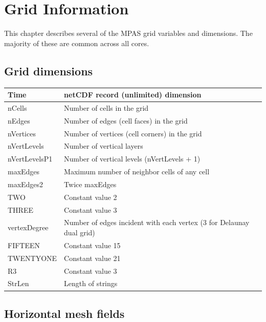 \chapter{Grid Information}

This chapter describes several of the MPAS grid variables and dimensions. The majority of these are common across all cores.

\section{Grid dimensions}

{\small
\begin{longtable}{|p{1.75in} |p{4.5in}|}
 \hline
        Time     &   netCDF record (unlimited) dimension \\ \hline
        nCells       &   Number of cells in the grid \\ \hline
        nEdges      &   Number of edges (cell faces) in the grid \\ \hline
        nVertices    &   Number of vertices (cell corners) in the grid \\ \hline
        nVertLevels     &   Number of vertical layers \\ \hline
        nVertLevelsP1   &   Number of vertical levels (nVertLevels + 1) \\ \hline
        maxEdges        &   Maximum number of neighbor cells of any cell \\ \hline
        maxEdges2       &   Twice maxEdges \\ \hline
        TWO              &   Constant value 2 \\ \hline
        THREE            &   Constant value 3 \\ \hline
        vertexDegree     &   Number of edges incident with each vertex (3 for Delaunay dual grid) \\ \hline
        FIFTEEN         &   Constant value 15 \\ \hline
        TWENTYONE       &   Constant value 21 \\ \hline
        R3               &   Constant value 3 \\ \hline
        StrLen          &   Length of strings \\ \hline
\end{longtable}
}

\section{Horizontal mesh fields}
\label{sec:mesh_fields}

